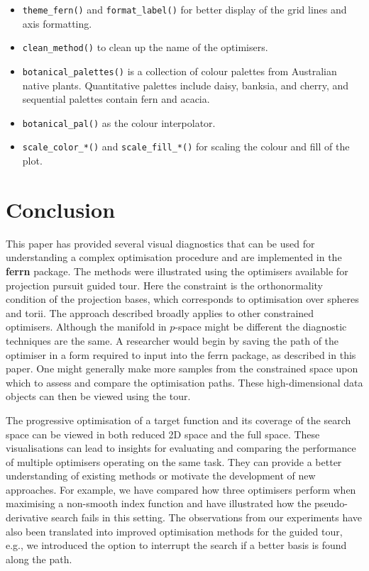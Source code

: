 \begin{itemize}
  \begin{itemize}
  \tightlist
  \item
    \texttt{theme\_fern()} and \texttt{format\_label()} for better
    display of the grid lines and axis formatting.
  \item
    \texttt{clean\_method()} to clean up the name of the optimisers.
  \item
    \texttt{botanical\_palettes()} is a collection of colour palettes
    from Australian native plants. Quantitative palettes include daisy,
    banksia, and cherry, and sequential palettes contain fern and
    acacia.
  \item
    \texttt{botanical\_pal()} as the colour interpolator.
  \item
    \texttt{scale\_color\_*()} and \texttt{scale\_fill\_*()} for scaling
    the colour and fill of the plot.
  \end{itemize}
\end{itemize}

\hypertarget{conclusion}{%
\section{Conclusion}\label{conclusion}}

This paper has provided several visual diagnostics that can be used for
understanding a complex optimisation procedure and are implemented in
the \textbf{ferrn} package. The methods were illustrated using the
optimisers available for projection pursuit guided tour. Here the
constraint is the orthonormality condition of the projection bases,
which corresponds to optimisation over spheres and torii. The approach
described broadly applies to other constrained optimisers. Although the
manifold in \(p\)-space might be different the diagnostic techniques are
the same. A researcher would begin by saving the path of the optimiser
in a form required to input into the ferrn package, as described in this
paper. One might generally make more samples from the constrained space
upon which to assess and compare the optimisation paths. These
high-dimensional data objects can then be viewed using the tour.

The progressive optimisation of a target function and its coverage of
the search space can be viewed in both reduced 2D space and the full
space. These visualisations can lead to insights for evaluating and
comparing the performance of multiple optimisers operating on the same
task. They can provide a better understanding of existing methods or
motivate the development of new approaches. For example, we have
compared how three optimisers perform when maximising a non-smooth index
function and have illustrated how the pseudo-derivative search fails in
this setting. The observations from our experiments have also been
translated into improved optimisation methods for the guided tour, e.g.,
we introduced the option to interrupt the search if a better basis is
found along the path.

